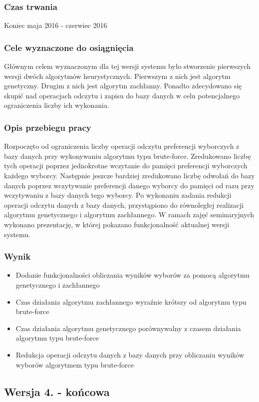 \documentclass[pdflatex,11pt]{../aghdoc_version2}
\begin{document}
\subsubsection{Czas trwania}
Koniec maja 2016 - czerwiec 2016
\subsubsection{Cele wyznaczone do osiągnięcia}
Głównym celem wyznaczonym dla tej wersji systemu było stworzenie pierwszych wersji
dwóch algorytmów heurystycznych. Pierwszym z nich jest algorytm genetyczny. Drugim z
nich jest algorytm zachłanny. Ponadto zdecydowano się skupić nad operacjach odczytu i
zapisu do bazy danych w celu potencjalnego ograniczenia liczby ich wykonania.
\subsubsection{Opis przebiegu pracy}
Rozpoczęto od ograniczenia liczby operacji odczytu preferencji wyborczych z bazy danych
przy wykonywaniu algorytmu typu brute-force. Zredukowano liczbę tych operacji poprzez
jednokrotne wczytanie do pamięci preferencji wyborczych każdego wyborcy. Następnie
jeszcze bardziej zredukowano liczbę odwołań do bazy danych poprzez wczytywanie
preferencji danego wyborcy do pamięci od razu przy wczytywaniu z bazy danych tego
wyborcy. Po wykonaniu zadania redukcji operacji odczytu danych z bazy danych,
przystąpiono do równoległej realizacji algorytmu genetycznego i algorytmu zachłannego. W
ramach zajęć seminaryjnych wykonano prezentację, w której pokazano funkcjonalność
aktualnej wersji systemu.
\subsubsection{Wynik}
\begin{itemize}
\item Dodanie funkcjonalności obliczania wyników wyborów za pomocą algorytmu
genetycznego i zachłannego
\item Czas działania algorytmu zachłannego wyraźnie krótszy od algorytmu typu
brute-force
\item Czas działania algorytmu genetycznego porównywalny z czasem działania algorytmu
typu brute-force
\item Redukcja operacji odczytu danych z bazy danych przy obliczaniu wyników wyborów
algorytmem typu brute-force
\end{itemize}
\subsection{Wersja 4. - końcowa}
\end{document}
